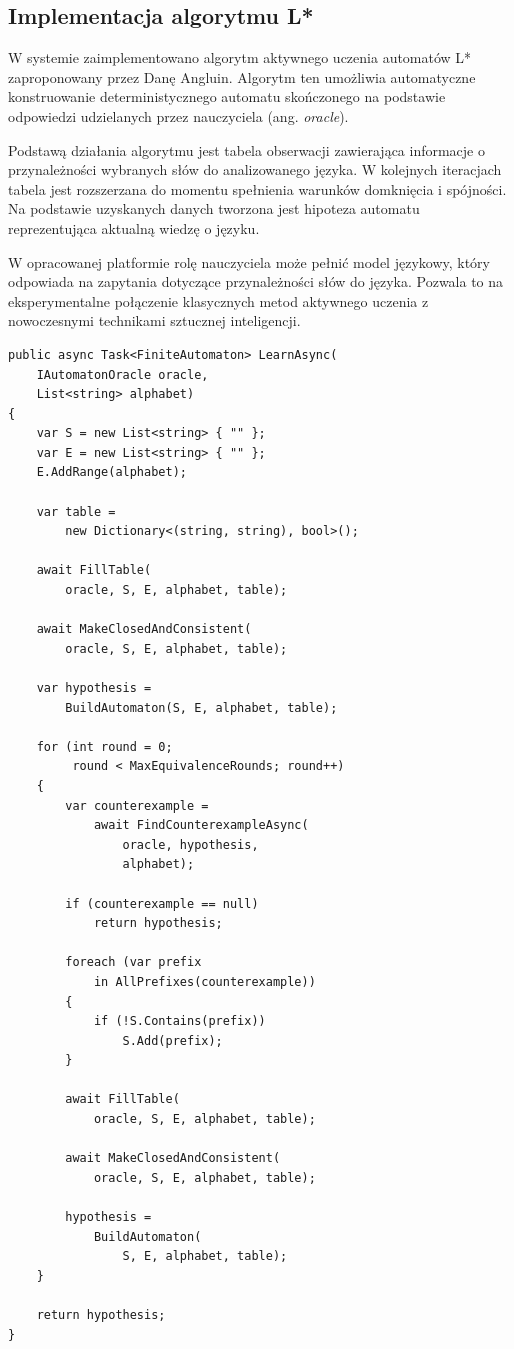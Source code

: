 \documentclass[12pt]{article}
\begin{document}
\subsection{Implementacja algorytmu L*} \cite{angluin1987}

W systemie zaimplementowano algorytm aktywnego uczenia automatów L* zaproponowany przez Danę Angluin. Algorytm ten umożliwia automatyczne konstruowanie deterministycznego automatu skończonego na podstawie odpowiedzi udzielanych przez nauczyciela (ang. \emph{oracle}).

Podstawą działania algorytmu jest tabela obserwacji zawierająca informacje o przynależności wybranych słów do analizowanego języka. W kolejnych iteracjach tabela jest rozszerzana do momentu spełnienia warunków domknięcia i spójności. Na podstawie uzyskanych danych tworzona jest hipoteza automatu reprezentująca aktualną wiedzę o języku.

W opracowanej platformie rolę nauczyciela może pełnić model językowy, który odpowiada na zapytania dotyczące przynależności słów do języka. Pozwala to na eksperymentalne połączenie klasycznych metod aktywnego uczenia z nowoczesnymi technikami sztucznej inteligencji.

\clearpage

\begin{lstlisting}[language={[Sharp]C},
caption={Kluczowy fragment implementacji algorytmu L*},
label={lst:lstar-main}]
public async Task<FiniteAutomaton> LearnAsync(
    IAutomatonOracle oracle,
    List<string> alphabet)
{
    var S = new List<string> { "" };
    var E = new List<string> { "" };
    E.AddRange(alphabet);

    var table =
        new Dictionary<(string, string), bool>();

    await FillTable(
        oracle, S, E, alphabet, table);

    await MakeClosedAndConsistent(
        oracle, S, E, alphabet, table);

    var hypothesis =
        BuildAutomaton(S, E, alphabet, table);

    for (int round = 0;
         round < MaxEquivalenceRounds; round++)
    {
        var counterexample =
            await FindCounterexampleAsync(
                oracle, hypothesis,
                alphabet);

        if (counterexample == null)
            return hypothesis;

        foreach (var prefix
            in AllPrefixes(counterexample))
        {
            if (!S.Contains(prefix))
                S.Add(prefix);
        }

        await FillTable(
            oracle, S, E, alphabet, table);

        await MakeClosedAndConsistent(
            oracle, S, E, alphabet, table);

        hypothesis =
            BuildAutomaton(
                S, E, alphabet, table);
    }

    return hypothesis;
}
\end{lstlisting}
\end{document}
